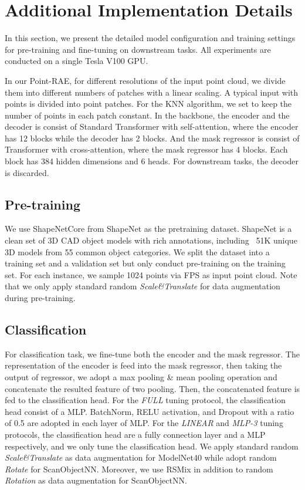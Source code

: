 \documentclass[sigconf, screen]{acmart}
\begin{document}
\section{Additional Implementation Details}

In this section, we present the detailed model configuration and training settings for pre-training and fine-tuning on downstream tasks. All experiments are conducted on a single Tesla V100 GPU.

In our Point-RAE, for different resolutions of the input point cloud, we divide them into different numbers of patches with a linear scaling.
A typical input with  points is divided into  point patches.
For the KNN algorithm, we set  to keep the number of points in each patch constant.
In the backbone, the encoder and the decoder is consist of Standard Transformer with self-attention, where the encoder has 12 blocks while the decoder has 2 blocks.
And the mask regressor is consist of Transformer with cross-attention, where the mask regressor has 4 blocks.
Each block has 384 hidden dimensions and 6 heads. 
For downstream tasks, the decoder is discarded.



\subsection{Pre-training}
We use ShapeNetCore from ShapeNet \cite{chang2015shapenet} as the pretraining dataset. 
ShapeNet is a clean set of 3D CAD object models with rich annotations, including ~51K unique 3D models from 55 common object categories.
We split the dataset into a training set and a validation set but only conduct pre-training on the training set. For each instance, we sample 1024 points via FPS as input point cloud. Note that we only apply standard random \textit{Scale\&Translate} for data augmentation during pre-training.


\subsection{Classification}
For classification task, we fine-tune both the encoder and the mask regressor.
The representation of the encoder is feed into the mask regressor, then taking the output of regressor, we adopt a max pooling \& mean pooling operation and concatenate the resulted feature of two pooling.
Then, the concatenated feature is fed to the classification head.
For the \textit{FULL} tuning protocol, the classification head consist of a MLP. BatchNorm, RELU activation, and Dropout with a ratio of 0.5 are adopted in each layer of MLP.
For the \textit{LINEAR} and \textit{MLP-3} tuning protocols, the classification head are a fully connection layer and a MLP respectively, and we only tune the classification head.
We apply standard random \textit{Scale\&Translate} as data augmentation for ModelNet40 while adopt random \textit{Rotate} for ScanObjectNN.
Moreover, we use RSMix \cite{lee2021regularization} in addition to random \textit{Rotation} as data augmentation for ScanObjectNN.
\end{document}
